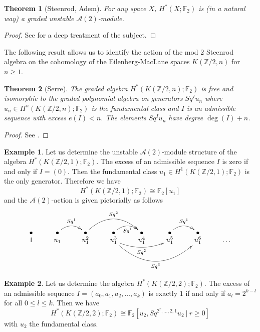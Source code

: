 \documentclass[11pt,a4paper]{amsart}
\theoremstyle{plain}
\newtheorem{thm}{Theorem}[section]
\theoremstyle{definition}
\newtheorem{exmp}{Example}[section]
\theoremstyle{remark}
\newcommand{\Z}{\mathbb{Z}}
\newcommand{\F}{\mathbb{F}}
\newcommand{\A}{\mathcal{A}}
\renewcommand{\geq}{\geqslant}
\renewcommand{\leq}{\leqslant}
\begin{document}
\begin{thm}[Steenrod, Adem]
For any space $X$, $H^*(X;\F_2)$ is (in a natural way) a graded unstable $\A(2)$-module.
\end{thm}

\begin{proof}
See \cite{SE-62} for a deep treatment of the subject.
\end{proof}

The following result allows us to identify the action of the mod $2$ Steenrod algebra on the cohomology of the Eilenberg-MacLane spaces $K(\Z/2,n)$ for $n\geq1$.

\begin{thm}[Serre]
The graded algebra $H^*(K(\Z/2,n);\F_2)$ is free and isomorphic to the graded polynomial algebra on generators $Sq^I u_n$ where $u_n\in H^n(K(\Z/2,n);\F_2)$ is the fundamental class and $I$ is an admissible sequence with excess $e(I)<n$. The elements $Sq^I u_n$ have degree $\deg(I)+n$.
\end{thm}

\begin{proof}
See \cite[Th\'eor\`eme 2, p. 203]{Se-53}.
\end{proof}

\begin{exmp}
Let us determine the unstable $\A(2)$-module structure of the algebra $H^*(K(\Z/2,1);\F_2)$. The excess of an admissible sequence $I$ is zero if and only if $I=(0)$. Then the fundamental class $u_1\in H^1(K(\Z/2,1);\F_2)$ is the only generator. Therefore we have
$$
H^*(K(\Z/2,1);\F_2)\cong \F_2[u_1]
$$ and the $\A(2)$-action is given pictorially as follows
$$\xymatrix@R=-0.1cm{
\bullet &\bullet\ar@/^10pt/[r]^-{Sq^1} &\bullet\ar@/^20pt/[rr]^-{Sq^2} &\bullet\ar@/^10pt/[r]_-{Sq^1} &\bullet &\bullet\ar@/^10pt/[r]^-{Sq^1} &\bullet \\
1 &u_1 &u_1^2 &u_1^3\ar@/_10pt/[rr]_-{Sq^2}\ar@/_30pt/[rrr]_-{Sq^3} &u_1^4 &u_1^5 &u_1^6 &\dots
}$$
\end{exmp}

\begin{exmp}
Let us determine the algebra $H^*(K(\Z/2,2);\F_2)$. The excess of an admissible sequence $I=(a_0,a_1,a_2,\dots,a_k)$ is exactly $1$ if and only if $a_l=2^{k-l}$ for all $0\leq l\leq k$. Then we have
$$
H^*(K(\Z/2,2);\F_2)\cong\F_2[u_2,Sq^{2^r,\dots,2,1}u_2\ |\ r\geq0]
$$ with $u_2$ the fundamental class.
\end{exmp}
\end{document}
